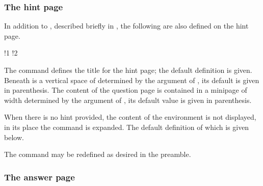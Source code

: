 \documentclass{article}
\begin{document}
\subsubsection{The hint page}

In addition to , described briefly in , the following are also defined
on the hint page.
\bVerb{}%
\edef\x{\the\wd\webtempboxi}%
\def\1{\hbox to0pt{\hskip\x\relax\quad\normalfont(\texttt{.25in})\hss}}%
\def\2{\hbox to0pt{\hskip\x\relax\quad\normalfont(\texttt{.85\string\linewidth})\hss}}%
%
\begin{dCmd}[commandchars=!()]{\bxSize}
\renewcommand{\ecHINT}{\textbf{HINT}}
!1
!2
\end{dCmd}
\eVerb The  command defines the title for the hint page;
the default definition is given. Beneath  is a vertical space
of  determined by the argument of , its
default is given in parenthesis. The content of the question page is
contained in a minipage of width  determined by the argument of
, its default value is given in parenthesis.



When there is no hint provided, the content of the  environment is
not displayed, in its place the command  is expanded. The
default definition of which is given below.\label{noHintProvided}
\bVerb{}%
\begin{dCmd}[commandchars=!()]{\bxSize}
\renewcommand{\noHintProvided}{No hint provided for this question.}
\end{dCmd}
\eVerb The command may be redefined as desired in the preamble.

\subsubsection{The answer page}
\end{document}
